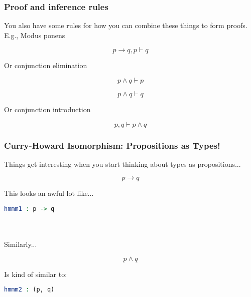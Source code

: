 \documentclass{beamer}
\begin{document}
\begin{frame}
  \frametitle{Proof and inference rules}

  You also have some rules for how you can combine these things to form proofs. E.g., Modus ponens

  \[p \rightarrow q, p \vdash q\]

  \pause

  Or conjunction elimination

  \[p \wedge q \vdash p\]

  \[p \wedge q \vdash q\]

  \pause

  Or conjunction introduction

  \[p, q \vdash p \wedge q\]
\end{frame}

\begin{frame}[fragile]
  \frametitle{Curry-Howard Isomorphism: Propositions as Types!}

  Things get interesting when you start thinking about types as propositions...

  \pause

  \[p \rightarrow q\]

  \pause
  This looks an awful lot like...

  \begin{lstlisting}[language=Idris]
    hmmm1 : p -> q
  \end{lstlisting}

  \pause \\~\\
  Similarly...

  \[p \wedge q\]

  \pause
  Is kind of similar to:

  \begin{lstlisting}[language=Idris]
    hmmm2 : (p, q)
  \end{lstlisting}
\end{frame}
\end{document}
